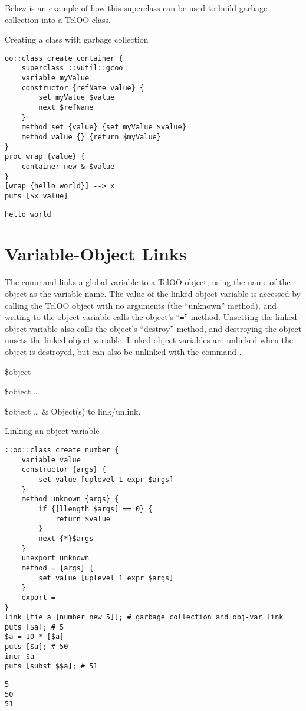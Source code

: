 \documentclass{article}
\begin{document}
Below is an example of how this superclass can be used to build garbage collection into a TclOO class. 
\begin{example}{Creating a class with garbage collection}
\begin{lstlisting}
oo::class create container {
    superclass ::vutil::gcoo
    variable myValue
    constructor {refName value} {
        set myValue $value
        next $refName
    }
    method set {value} {set myValue $value}
    method value {} {return $myValue}
}
proc wrap {value} {
    container new & $value
}
[wrap {hello world}] --> x
puts [$x value]
\end{lstlisting}
\tcblower
\begin{lstlisting}
hello world
\end{lstlisting}
\end{example}

\clearpage
\section{Variable-Object Links}
The command  links a global variable to a TclOO object, using the name of the object as the variable name. 
The value of the linked object variable is accessed by calling the TclOO object with no arguments (the ``unknown'' method), and writing to the object-variable calls the object's ``\texttt{=}'' method. 
Unsetting the linked object variable also calls the object's ``destroy'' method, and destroying the object unsets the linked object variable.
Linked object-variables are unlinked when the object is destroyed, but can also be unlinked with the command .
\begin{syntax}
 \$object
\end{syntax}
\begin{syntax}
 \$object …
\end{syntax}
\begin{args}
\$object … & Object(s) to link/unlink.
\end{args}
\begin{example}{Linking an object variable}
\begin{lstlisting}
::oo::class create number {
    variable value
    constructor {args} {
        set value [uplevel 1 expr $args]
    }
    method unknown {args} {
        if {[llength $args] == 0} {
            return $value
        }
        next {*}$args
    }
    unexport unknown
    method = {args} {
        set value [uplevel 1 expr $args]
    }
    export =
}
link [tie a [number new 5]]; # garbage collection and obj-var link
puts [$a]; # 5
$a = 10 * [$a]
puts [$a]; # 50
incr $a
puts [subst $$a]; # 51
\end{lstlisting}
\tcblower
\begin{lstlisting}
5
50
51
\end{lstlisting}
\end{example}
\clearpage
\end{document}

